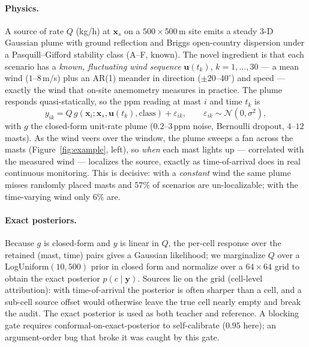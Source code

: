 \documentclass{article}
\begin{document}
\paragraph{Physics.} A source of rate $Q$ (kg/h) at $\boldsymbol{x}_s$ on a $500\times500$\,m
site emits a steady 3-D Gaussian plume with ground reflection and Briggs open-country
dispersion under a Pasquill--Gifford stability class (A--F, known). The novel ingredient is
that each scenario has a \emph{known, fluctuating wind sequence} $\boldsymbol{u}(t_k)$,
$k=1,\dots,30$ --- a mean wind ($1$--$8$\,m/s) plus an AR(1) meander in direction
($\pm20$--$40^\circ$) and speed --- exactly the wind that on-site anemometry measures in
practice. The plume responds quasi-statically, so the ppm reading at mast $i$ and time
$t_k$ is
\begin{equation}
y_{ik} = Q\, g(\boldsymbol{x}_i; \boldsymbol{x}_s, \boldsymbol{u}(t_k), \text{class}) + \varepsilon_{ik},
\qquad \varepsilon_{ik}\sim\mathcal{N}(0,\sigma^2),
\end{equation}
with $g$ the closed-form unit-rate plume ($0.2$--$3$\,ppm noise, Bernoulli dropout, $4$--$12$
masts). As the wind veers over the window, the plume sweeps a fan across the masts
(Figure~\ref{fig:example}, left), so \emph{when} each mast lights up --- correlated with
the measured wind --- localizes the source, exactly as time-of-arrival does in real
continuous monitoring. This is decisive: with a \emph{constant} wind the same plume misses
randomly placed masts and $57\%$ of scenarios are un-localizable; with the time-varying
wind only $6\%$ are.

\paragraph{Exact posteriors.} Because $g$ is closed-form and $y$ is linear in $Q$, the
per-cell response over the retained (mast, time) pairs gives a Gaussian likelihood; we
marginalize $Q$ over a LogUniform$(10,500)$ prior in closed form and normalize over a
$64\times64$ grid to obtain the exact posterior $p(c\mid\boldsymbol{y})$. Sources lie on the
grid (cell-level attribution): with time-of-arrival the posterior is often sharper than a
cell, and a sub-cell source offset would otherwise leave the true cell nearly empty and
break the audit. The exact posterior is used as both teacher and reference. A blocking
gate requires conformal-on-exact-posterior to self-calibrate ($0.95$ here); an
argument-order bug that broke it was caught by this gate.
\end{document}
